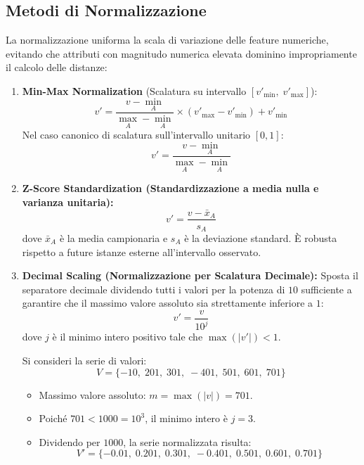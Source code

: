 \FloatBarrier

\subsection{Metodi di Normalizzazione}
La normalizzazione uniforma la scala di variazione delle feature numeriche, evitando che attributi con magnitudo numerica elevata dominino impropriamente il calcolo delle distanze:

\begin{enumerate}
    \item \textbf{Min-Max Normalization} (Scalatura su intervallo $[v'_{\min}, \; v'_{\max}]$):
    \begin{equation}
    v' = \frac{v - \min_A}{\max_A - \min_A} \times (v'_{\max} - v'_{\min}) + v'_{\min}
    \end{equation}
    Nel caso canonico di scalatura sull'intervallo unitario $[0, 1]$:
    \begin{equation}
    v' = \frac{v - \min_A}{\max_A - \min_A}
    \end{equation}

    \item \textbf{Z-Score Standardization (Standardizzazione a media nulla e varianza unitaria):}
    \begin{equation}
    v' = \frac{v - \bar{x}_A}{s_A}
    \end{equation}
    dove $\bar{x}_A$ è la media campionaria e $s_A$ è la deviazione standard. È robusta rispetto a future istanze esterne all'intervallo osservato.

    \item \textbf{Decimal Scaling (Normalizzazione per Scalatura Decimale):}
    Sposta il separatore decimale dividendo tutti i valori per la potenza di $10$ sufficiente a garantire che il massimo valore assoluto sia strettamente inferiore a $1$:
    \begin{equation}
    v' = \frac{v}{10^j}
    \end{equation}
    dove $j$ è il minimo intero positivo tale che $\max(|v'|) < 1$.
    \begin{example}
    Si consideri la serie di valori:
    \begin{equation*}
    V = \{-10, \; 201, \; 301, \; -401, \; 501, \; 601, \; 701\}
    \end{equation*}
    \begin{itemize}
        \item Massimo valore assoluto: $m = \max(|v|) = 701$.
        \item Poiché $701 < 1000 = 10^3$, il minimo intero è $j = 3$.
        \item Dividendo per $1000$, la serie normalizzata risulta:
        \begin{equation}
        V' = \{-0.01, \; 0.201, \; 0.301, \; -0.401, \; 0.501, \; 0.601, \; 0.701\}
        \end{equation}
    \end{itemize}
    \end{example}
\end{enumerate}

